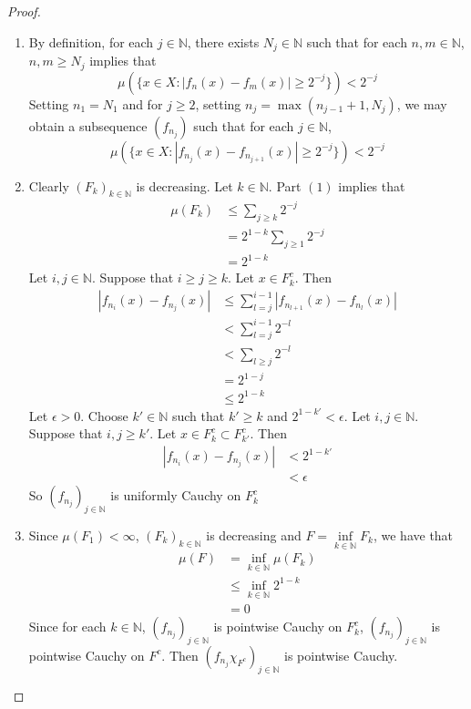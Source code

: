 \documentclass{book}
\theoremstyle{definition}
\newcommand{\ep}{\epsilon}
\newcommand{\N}{\mathbb{N}}
\DeclareMathOperator*{\0}{\mbf{0}}
\DeclareMathOperator*{\1}{\mbf{1}}
\begin{document}
	\begin{proof}\
	\begin{enumerate}
	\item By definition, for each $j \in \N$, there exists $N_j \in \N$ such that for each $n,m \in \N$, $n,m \geq N_j$ implies that 
	$$\mu(\{x \in X: |f_n(x) - f_m(x)| \geq 2^{-j} \}) < 2^{-j}$$ 
	Setting $n_1 = N_1$ and for $j \geq 2$, setting $n_j = \max (n_{j-1}+1, N_j)$, we may obtain a subsequence $(f_{n_j})$ such that for each $j \in \N$, 
	$$\mu(\{x \in X: |f_{n_j}(x) - f_{n_{j+1}}(x)| \geq 2^{-j}\}) < 2^{-j}$$
	\item Clearly $(F_k)_{k \in \N}$ is decreasing. Let $k \in \N$. Part $(1)$ implies that 
	\begin{align*}
	\mu(F_k) 
	&\leq \sum_{j \geq k}2^{-j} \\
	&= 2^{1-k}\sum_{j \geq 1}2^{-j}  \\
	&= 2^{1-k}
	\end{align*}
	Let $i, j \in \N$. Suppose that $i \geq j \geq k$. Let $x \in F_k^c$. Then 
	\begin{align*}
	|f_{n_i}(x) - f_{n_j}(x)| 
	& \leq \sum_{l = j}^{i-1} |f_{n_{l+1}}(x) - f_{n_l}(x)| \\
	& < \sum_{l = j}^{i-1} 2^{-l} \\
	& <  \sum_{l \geq j} 2^{-l} \\
	&= 2^{1 - j} \\
	& \leq 2^{1 - k}	 
	\end{align*}
	Let $\ep >0$. Choose $k' \in \N$ such that $k' \geq k$ and $2^{1-k'} < \ep$. Let $i,j \in \N$. Suppose that $i,j \geq k'$. Let $x \in F_k^c \subset F_{k'}^c$. Then 
	\begin{align*}
	|f_{n_i}(x) - f_{n_j}(x)| 
	&< 2^{1-k'} \\
	&< \ep 
	\end{align*}
	So $(f_{n_j})_{j \in \N}$ is uniformly Cauchy on $F_k^c$
	\item Since $\mu(F_1) < \infty $, $(F_k)_{k \in \N}$ is decreasing and $F = \inf\limits_{k \in \N}F_k$, we have that
	\begin{align*}
	\mu(F) 
	&= \inf_{k \in \N} \mu(F_k) \\
	&\leq \inf_{k \in \N} 2^{1-k} \\
	&= 0
	\end{align*}
	Since for each $k \in \N$, $(f_{n_j})_{j \in \N}$ is pointwise Cauchy on $F^c_k$, $(f_{n_j})_{j \in \N}$ is pointwise Cauchy on $F^c$. Then $(f_{n_j}\chi_{F^c})_{j \in \N}$ is pointwise Cauchy. \\

\end{enumerate}
\end{proof}
\end{document}
